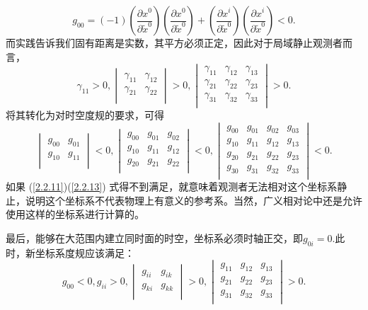 \documentclass[11pt, a4paper, oneside, onecolumn]{ctexart}
\numberwithin{equation}{subsection}
\begin{document}
\begin{equation}
g_{00}=\left(-1\right)\left(\frac{\partial{}x^{0}}{\partial{}\widetilde{x}^{0}}\right)\left(\frac{\partial{}x^{0}}{\partial{}\widetilde{x}^{0}}\right)+\left(\frac{\partial{}x^{i}}{\partial{}\widetilde{x}^{0}}\right)\left(\frac{\partial{}x^{i}}{\partial{}\widetilde{x}^{0}}\right)<0.\label{2.2.11}
\end{equation}
而实践告诉我们固有距离是实数，其平方必须正定，因此对于局域静止观测者而言，
\begin{equation}
\gamma_{11}>0,\begin{vmatrix}
\gamma_{11} & \gamma_{12}\\
\gamma_{21} & \gamma_{22}\\
\end{vmatrix}>0,\begin{vmatrix}
\gamma_{11} & \gamma_{12} & \gamma_{13}\\
\gamma_{21} & \gamma_{22} & \gamma_{23}\\
\gamma_{31} & \gamma_{32} & \gamma_{33}\\
\end{vmatrix}>0.
\end{equation}
将其转化为对时空度规的要求，可得
\begin{equation}
\begin{vmatrix}
g_{00} & g_{01}\\
g_{10} & g_{11}\\
\end{vmatrix}<0,
\begin{vmatrix}
g_{00} & g_{01} & g_{02}\\
g_{10} & g_{11} & g_{12}\\
g_{20} & g_{21} & g_{22}\\
\end{vmatrix}<0,
\begin{vmatrix}
g_{00} & g_{01} & g_{02} & g_{03}\\
g_{10} & g_{11} & g_{12} & g_{13}\\
g_{20} & g_{21} & g_{22} & g_{23}\\
g_{30} & g_{31} & g_{32} & g_{33}\\
\end{vmatrix}<0.\label{2.2.13}
\end{equation}
如果 (\ref{2.2.11})(\ref{2.2.13}) 式得不到满足，就意味着观测者无法相对这个坐标系静止，说明这个坐标系不代表物理上有意义的参考系。当然，广义相对论中还是允许使用这样的坐标系进行计算的。

最后，能够在大范围内建立同时面的时空，坐标系必须时轴正交，即$g_{0i}=0$.此时，新坐标系度规应该满足：
\begin{equation}
g_{00}<0,g_{ii}>0,
\begin{vmatrix}
g_{ii} & g_{ik}\\
g_{ki} & g_{kk}\\
\end{vmatrix}>0,
\begin{vmatrix}
g_{11} & g_{12} & g_{13}\\
g_{21} & g_{22} & g_{23}\\
g_{31} & g_{32} & g_{33}\\
\end{vmatrix}>0.
\end{equation}
\end{document}
